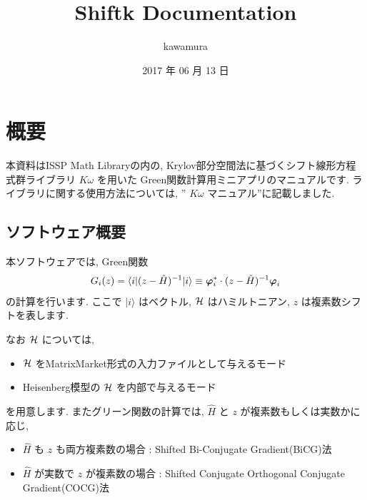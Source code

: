 \documentclass[letterpaper,10pt,dvipdfmx,openany]{sphinxmanual}
\title{Shiftk Documentation}
\date{2017 年 06 月 13 日}
\author{kawamura}
\begin{document}
\maketitle
\tableofcontents
{}\label{index::doc}



\chapter{概要}
\label{shiftk_overview_ja:welcome-to-sample-program-s-documentation}\label{shiftk_overview_ja::doc}\label{shiftk_overview_ja:id1}
本資料はISSP Math
Libraryの内の, Krylov部分空間法に基づくシフト線形方程式群ライブラリ
\(K\omega\) を用いた Green関数計算用ミニアプリのマニュアルです.
ライブラリに関する使用方法については, '' \(K\omega\) マニュアル''に記載しました.


\section{ソフトウェア概要}
\label{shiftk_overview_ja:id2}
本ソフトウェアでは, Green関数
\begin{gather}
\begin{split}\begin{align}
G_{i}(z) =
\langle i | (z-{\hat H})^{-1}| i \rangle
\equiv
{\boldsymbol \varphi}_i^{*} \cdot (z-{\hat H})^{-1} {\boldsymbol \varphi}_i
\end{align}\end{split}\notag
\end{gather}
の計算を行います.
ここで \(| i \rangle\) はベクトル, \({\cal H}\) はハミルトニアン,
\(z\) は複素数シフトを表します.

なお \({\cal H}\) については,
\begin{itemize}
\item {} 
\({\cal H}\) をMatrixMarket形式の入力ファイルとして与えるモード

\item {} 
Heisenberg模型の \({\cal H}\) を内部で与えるモード

\end{itemize}

を用意します.
またグリーン関数の計算では, \({\hat H}\) と \(z\) が複素数もしくは実数かに応じ,
\begin{itemize}
\item {} 
\({\hat H}\) も \(z\) も両方複素数の場合 : Shifted
Bi-Conjugate Gradient(BiCG)法

\item {} 
\({\hat H}\) が実数で \(z\) が複素数の場合 : Shifted
Conjugate Orthogonal Conjugate Gradient(COCG)法

\end{itemize}
\end{document}
